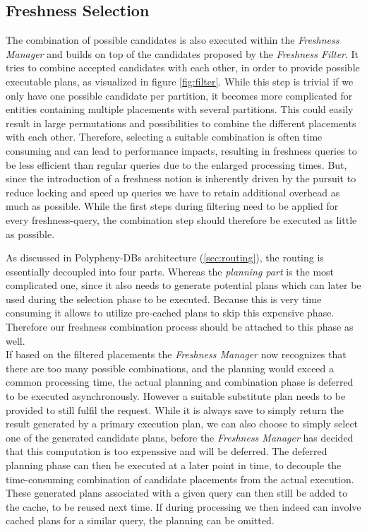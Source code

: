 

\subsection{Freshness Selection}
\label{sec:fresh_select}

The combination of possible candidates is also executed within the \emph{Freshness Manager} and builds on top of the candidates proposed by the \emph{Freshness Filter}.
It tries to combine accepted candidates with each other, in order to provide possible executable plans, as visualized in figure \ref{fig:filter}.
While this step is trivial if we only have one possible candidate per partition, it becomes more complicated for entities containing multiple placements 
with several partitions. This could easily result in large permutations and possibilities to combine the different placements with each other.
Therefore, selecting a suitable combination is often time consuming and can lead to performance impacts, 
resulting in freshness queries to be less efficient than regular queries due to the enlarged processing times. 
But, since the introduction of a freshness notion is inherently driven by the pursuit to reduce locking and speed up queries we have to 
retain additional overhead as much as possible. 
While the first steps during filtering need to be applied for every freshness-query, the combination step should therefore be executed as little as possible.

As discussed in Polypheny-DBs architecture (\ref{sec:routing}), the routing is essentially decoupled into four parts.
Whereas the \emph{planning part} is the most complicated one, since it also needs to generate potential plans which can later be used during the selection phase 
to be executed. Because this is very time consuming it allows to utilize pre-cached plans to skip this expensive phase.
Therefore our freshness combination process should be attached to this phase as well. \\

If based on the filtered placements the \emph{Freshness Manager} now recognizes that there are too many possible combinations, and the planning would 
exceed a common processing time, the actual planning and combination phase is deferred to be executed asynchronously.
However a suitable substitute plan needs to be provided to still fulfil the request.
While it is always save to simply return the result generated by a primary execution plan, we can also choose to simply select one of the generated candidate plans, before
the \emph{Freshness Manager} has decided that this computation is too expenssive and will be deferred. 
The deferred planning phase can then be executed at a later point in time, to decouple the time-consuming combination of candidate placements from the actual execution.
These generated plans associated with a given query can then still be added to the cache, to be reused next time.
If during processing we then indeed can involve cached plans for a similar query, the planning can be omitted.\\

